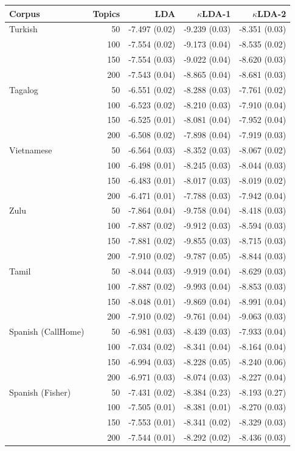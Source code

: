 \begin{table}
\begin{center}
   \begin{tabular}{lrrrr}\toprule
   \textbf{Corpus}  &  \textbf{Topics} & \textbf{LDA} & \textbf{$\kappa$LDA-1} & \textbf{$\kappa$LDA-2}\\ \midrule
Turkish & 50 & -7.497 (0.02) & -9.239 (0.03) & -8.351 (0.03) \\
 & 100 & -7.554 (0.02) & -9.173 (0.04) & -8.535 (0.02) \\
 & 150 & -7.554 (0.03) & -9.022 (0.04) & -8.620 (0.03) \\
 & 200 & -7.543 (0.04) & -8.865 (0.04) & -8.681 (0.03) \\
Tagalog & 50 & -6.551 (0.02) & -8.288 (0.03) & -7.761 (0.02) \\
 & 100 & -6.523 (0.02) & -8.210 (0.03) & -7.910 (0.04) \\
 & 150 & -6.525 (0.01) & -8.081 (0.04) & -7.952 (0.04) \\
 & 200 & -6.508 (0.02) & -7.898 (0.04) & -7.919 (0.03) \\
Vietnamese & 50 & -6.564 (0.03) & -8.352 (0.03) & -8.067 (0.02) \\
 & 100 & -6.498 (0.01) & -8.245 (0.03) & -8.044 (0.03) \\
 & 150 & -6.483 (0.01) & -8.017 (0.03) & -8.019 (0.02) \\
 & 200 & -6.471 (0.01) & -7.788 (0.03) & -7.942 (0.04) \\
Zulu & 50 & -7.864 (0.04) & -9.758 (0.04) & -8.418 (0.03) \\
 & 100 & -7.887 (0.02) & -9.912 (0.03) & -8.594 (0.03) \\
 & 150 & -7.881 (0.02) & -9.855 (0.03) & -8.715 (0.03) \\
 & 200 & -7.910 (0.02) & -9.787 (0.05) & -8.844 (0.03) \\
Tamil & 50 & -8.044 (0.03) & -9.919 (0.04) & -8.629 (0.03) \\
 & 100 & -7.887 (0.02) & -9.993 (0.04) & -8.853 (0.03) \\
 & 150 & -8.048 (0.01) & -9.869 (0.04) & -8.991 (0.04) \\
 & 200 & -7.910 (0.02) & -9.761 (0.04) & -9.063 (0.03) \\
Spanish (CallHome) & 50 & -6.981 (0.03) & -8.439 (0.03) & -7.933 (0.04) \\
 & 100 & -7.034 (0.02) & -8.341 (0.04) & -8.164 (0.04) \\
 & 150 & -6.994 (0.03) & -8.228 (0.05) & -8.240 (0.06) \\
 & 200 & -6.971 (0.03) & -8.074 (0.03) & -8.227 (0.04) \\
Spanish (Fisher) & 50 & -7.431 (0.02) & -8.384 (0.23) & -8.193 (0.27) \\ %
 & 100 & -7.505 (0.01) & -8.381 (0.01) & -8.270 (0.03) \\
 & 150 & -7.553 (0.01) & -8.341 (0.02) & -8.329 (0.03) \\
 & 200 & -7.544 (0.01) & -8.292 (0.02) & -8.436 (0.03) \\


\end{tabular}
\end{center}
\end{table}
